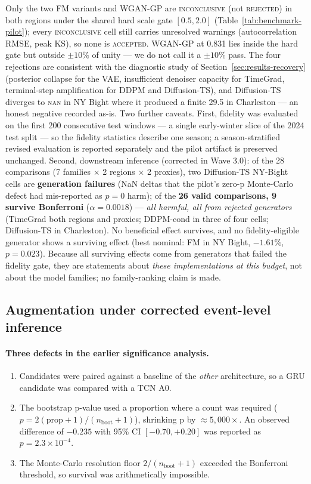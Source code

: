 Only the two FM variants and WGAN-GP are \textsc{inconclusive} (not
\textsc{rejected}) in both regions under the shared hard scale gate
$[0.5, 2.0]$ (Table~\ref{tab:benchmark-pilot}); every \textsc{inconclusive}
cell still carries unresolved warnings (autocorrelation RMSE, peak KS), so
none is \textsc{accepted}. WGAN-GP at 0.831 lies inside the hard gate but
outside $\pm 10\%$ of unity — we do not call it a $\pm 10\%$ pass. The four
rejections are consistent with the diagnostic study of
Section~\ref{sec:results-recovery} (posterior collapse for the VAE,
insufficient denoiser capacity for TimeGrad, terminal-step amplification for
DDPM and Diffusion-TS), and Diffusion-TS diverges to \textsc{nan} in NY Bight
where it produced a finite 29.5 in Charleston — an honest negative recorded
as-is. Two further caveats. First, fidelity was evaluated on the first 200
consecutive test windows — a single early-winter slice of the 2024 test
split — so the fidelity statistics describe one season; a season-stratified
revised evaluation is reported separately and the pilot artifact is preserved
unchanged. Second, downstream inference (corrected in Wave 3.0): of the 28
comparisons (7 families $\times$ 2 regions $\times$ 2 proxies), two
Diffusion-TS NY-Bight cells are \textbf{generation failures} (NaN deltas
that the pilot's zero-p Monte-Carlo defect had mis-reported as
$p=0$ harm); of the \textbf{26 valid comparisons, 9 survive Bonferroni}
($\alpha = 0.0018$) — \emph{all harmful, all from rejected generators}
(TimeGrad both regions and proxies; DDPM-cond in three of four cells;
Diffusion-TS in Charleston). No beneficial effect survives, and no
fidelity-eligible generator shows a surviving effect (best nominal: FM in NY
Bight, $-1.61\%$, $p=0.023$). Because all surviving effects come from
generators that failed the fidelity gate, they are statements about
\emph{these implementations at this budget}, not about the model families;
no family-ranking claim is made.

\subsection{Augmentation under corrected event-level inference}
\label{sec:results-augmentation}

\paragraph{Three defects in the earlier significance analysis.}
\begin{enumerate}
    \item Candidates were paired against a baseline of the \emph{other}
    architecture, so a GRU candidate was compared with a TCN A0.
    \item The bootstrap p-value used a proportion where a count was required
    ($p = 2(\text{prop}+1)/(n_\text{boot}+1)$), shrinking p by
    $\approx 5{,}000\times$. An observed difference of $-0.235$ with 95\% CI
    $[-0.70, +0.20]$ was reported as $p = 2.3\times10^{-4}$.
    \item The Monte-Carlo resolution floor $2/(n_\text{boot}+1)$ exceeded the
    Bonferroni threshold, so survival was arithmetically impossible.
\end{enumerate}

